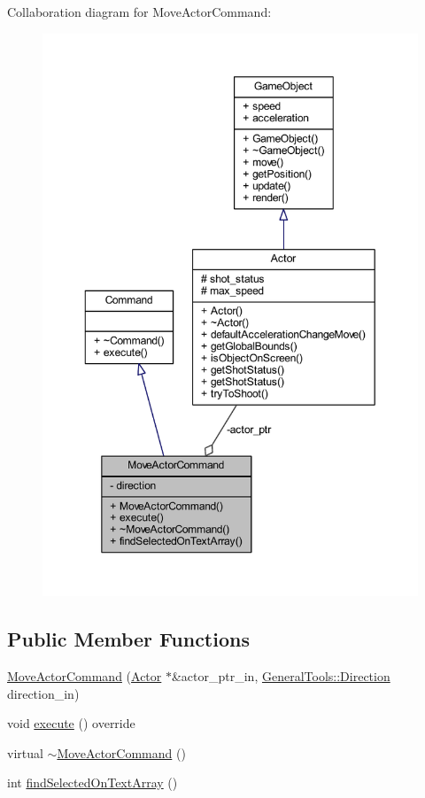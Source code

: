 Collaboration diagram for Move\+Actor\+Command\+:\nopagebreak
\begin{figure}[H]
\begin{center}
\leavevmode
\includegraphics[width=350pt]{class_move_actor_command__coll__graph}
\end{center}
\end{figure}
\subsection*{Public Member Functions}
\begin{DoxyCompactItemize}
\item 
\hyperlink{class_move_actor_command_af042d9025beccabd97665aabd434297e}{Move\+Actor\+Command} (\hyperlink{class_actor}{Actor} $\ast$\&actor\+\_\+ptr\+\_\+in, \hyperlink{namespace_general_tools_afedc3bd242369903830dec92c3ad569b}{General\+Tools\+::\+Direction} direction\+\_\+in)
\item 
void \hyperlink{class_move_actor_command_a62ff2dc8808da57913d1e5aa43c10cfb}{execute} () override
\item 
virtual \hyperlink{class_move_actor_command_a6b826449c1ca94181966deaabeb02ede}{$\sim$\+Move\+Actor\+Command} ()
\item 
int \hyperlink{class_move_actor_command_a4e29605f2a8d05b9d91f622001b22749}{find\+Selected\+On\+Text\+Array} ()
\end{DoxyCompactItemize}
